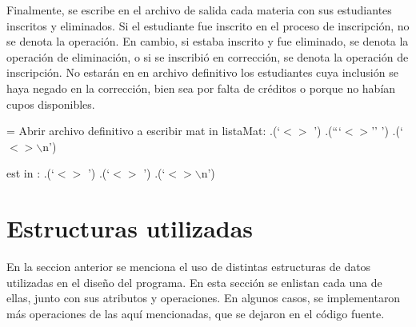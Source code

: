 \documentclass[11pt]{article}
\begin{document}
   Finalmente, se escribe en el archivo de salida cada materia con sus 
   estudiantes inscritos y eliminados. Si el estudiante fue inscrito en
   el proceso de inscripción, no se denota la operación. En cambio, si 
   estaba inscrito y fue eliminado, se denota la operación de eliminación,
   o si se inscribió en corrección, se denota la operación de inscripción.
   No estarán en en archivo definitivo los estudiantes cuya inclusión se
   haya negado en la corrección, bien sea por falta de créditos o porque
   no habían cupos disponibles.

   \begin{codebox}
      \li {} = Abrir archivo definitivo a escribir
      \li \For mat in listaMat:
      \Do
         \li {}.(`$<$$>$ ')
         \li {}.(```$<$$>$'' ')
         \li {}.(`$<$$>\backslash$n')
         
         \li \For est in :
         \Do
            \li {}.(`$<$$>$ ')
            \li {}.(`$<$$>$ ') 
            \li {}.(`$<$$>\backslash$n') \label{li:Generar-Archivo-Definitivo-final}
            \End
         \End
         \End
      \End
   \end{codebox}

   \section{Estructuras utilizadas}

   En la seccion anterior se menciona el uso de distintas estructuras de datos
   utilizadas en el diseño del programa. En esta sección se enlistan cada una
   de ellas, junto con sus atributos y operaciones. En algunos casos, se implementaron
   más operaciones de las aquí mencionadas, que se dejaron en el código fuente.
\end{document}
